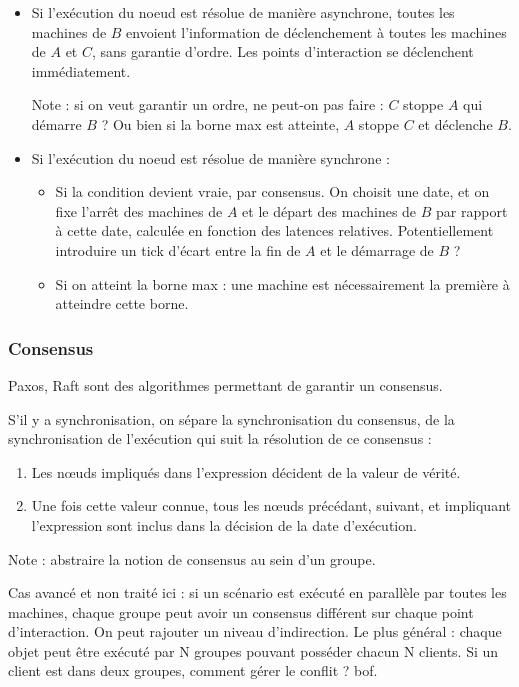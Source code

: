 \documentclass{article}
\newcommand\trigger{point d'interaction\xspace}
\newcommand\triggers{points d'interaction\xspace}
\begin{document}
\begin{itemize}
    \item Si l'exécution du noeud est résolue de manière asynchrone, toutes les machines de $B$ envoient l'information de déclenchement à toutes les machines de $A$ et $C$, sans garantie d'ordre. Les \triggers se déclenchent immédiatement.
    
    Note : si on veut garantir un ordre, ne peut-on pas faire : $C$ stoppe $A$ qui démarre $B$ ? Ou bien si la borne max est atteinte, $A$ stoppe $C$ et déclenche $B$.
    
    \item Si l'exécution du noeud est résolue de manière synchrone : 
    \begin{itemize}
        \item Si la condition devient vraie, par consensus. On choisit une date, et on fixe l'arrêt des machines de $A$ et le départ des machines de $B$ par rapport à cette date, calculée en fonction des latences relatives. Potentiellement introduire un tick d'écart entre la fin de $A$ et le démarrage de $B$ ?
        \item Si on atteint la borne max : une machine est nécessairement la première à atteindre cette borne.
    \end{itemize}
\end{itemize}

\subsubsection{Consensus}
Paxos, Raft sont des algorithmes permettant de garantir un consensus.%


S'il y a synchronisation, on sépare la synchronisation du consensus, de la synchronisation de l'exécution qui suit la résolution de ce consensus : 
\begin{enumerate}
    \item Les nœuds impliqués dans l'expression décident de la valeur de vérité.
    \item Une fois cette valeur connue, tous les nœuds précédant, suivant, et impliquant l'expression sont inclus dans la décision de la date d'exécution.
\end{enumerate}

Note : abstraire la notion de consensus au sein d'un groupe.

Cas avancé et non traité ici : si un scénario est exécuté en parallèle par toutes les machines, chaque groupe peut avoir un consensus différent sur chaque \trigger.
On peut rajouter un niveau d'indirection. Le plus général : chaque objet peut être exécuté par N groupes pouvant posséder chacun N clients.
Si un client est dans deux groupes, comment gérer le conflit ? bof.
\end{document}
